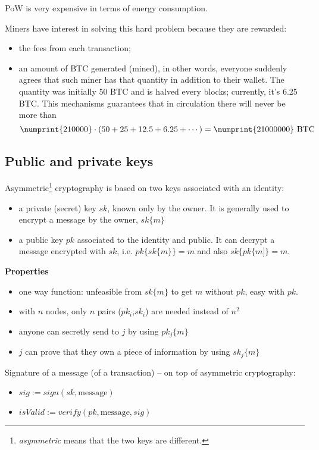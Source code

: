 PoW is very expensive in terms of energy consumption.

Miners have interest in solving this hard problem because they are rewarded:
\begin{itemize}
    \item the fees from each transaction;
    \item an amount of BTC generated (mined), in other words, everyone suddenly agrees that such miner has that quantity in addition to their wallet. The quantity was initially 50 BTC and is halved every  blocks; currently, it's 6.25 BTC. This mechanisms guarantees that in circulation there will never be more than
    \begin{equation*}
        \numprint{210000} \cdot (50+25+12.5+6.25+\cdots) = \numprint{21000000}\ \text{BTC}
    \end{equation*}
\end{itemize}

\subsection{Public and private keys}

Asymmetric\footnote{\textit{asymmetric} means that the two keys are different.} cryptography is based on two keys associated with an identity:
\begin{itemize}
    \item a private (secret) key $sk$, known only by the owner. It is generally used to encrypt a message by the owner, $sk\{m\}$
    \item a public key $pk$ associated to the identity and public. It can decrypt a message encrypted with $sk$, i.e. $pk\{sk\{m\}\} =m$ and also $sk\{pk\{m]\} =m$.
\end{itemize}

\textbf{Properties}
\begin{itemize}
    \item one way function: unfeasible from $sk\{m\}$ to get $m$ without $pk$, easy with $pk$.
    \item with $n$ nodes, only $n$ pairs ($pk_{i}$,$sk_{i}$) are needed instead of $n^{2}$
    \item anyone can secretly send to $j$ by using $pk_{j}\{m\}$
    \item $j$ can prove that they own a piece of information by using $sk_{j}\{m\}$
\end{itemize}

Signature of a message (of a transaction) -- on top of asymmetric cryptography:
\begin{itemize}
    \item $sig:=sign(sk,\text{message})$
    \item $isValid:=verify(pk,\text{message},sig)$
\end{itemize}

